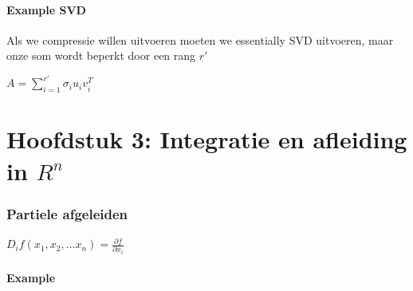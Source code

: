 \documentclass[a4paper]{report}
\begin{document}
\subsubsection{Example SVD}

Als we compressie willen uitvoeren moeten we essentially SVD uitvoeren, maar onze som wordt beperkt door een rang $r'$

$A = \sum_{i=1}^{r'} \sigma_i u_i v_i^T$

\chapter{Hoofdstuk 3: Integratie en afleiding in $R^n$}

\subsection{Partiele afgeleiden}

$D_i f(x_1, x_2, ... x_n) = \frac{\partial f}{\partial x_i}$

\subsubsection{Example}
\end{document}
